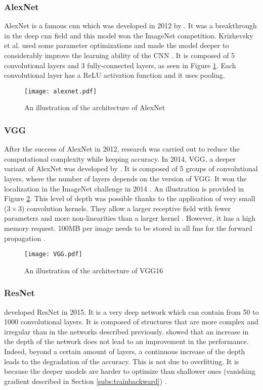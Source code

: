 \subsubsection{AlexNet}
%
AlexNet is a famous \acrshort{cnn} which was developed in 2012 by \textcite{krizhevsky_imagenet_2012}. It was a breakthrough in the deep \acrshort{cnn} field and this model won the ImageNet competition. Krizhevsky et al. used some parameter optimizations and made the model deeper to considerably improve the learning ability of the CNN \cite{khan_survey_2020}. It is composed of 5 convolutional layers and 3 fully-connected layers, as seen in Figure \ref{fig:alexnet}. Each convolutional layer has a ReLU activation function and it uses pooling.
%
\begin{figure}[H]
    \centering
    \texttt{[image: alexnet.pdf]}
    \caption{An illustration of the architecture of AlexNet \cite{krizhevsky_imagenet_2012}}
    \label{fig:alexnet}
\end{figure}
%
\subsubsection{VGG}
%
After the success of AlexNet in 2012, research was carried out to reduce the computational complexity while keeping accuracy. In 2014, VGG, a deeper variant of AlexNet was developed by \textcite{simonyan_very_2015}. It is composed of 5 groups of convolutional layers, where the number of layers depends on the version of VGG. It won the localization in the ImageNet challenge in 2014 \cite{simonyan_very_2015}. An illustration is provided in Figure \ref{fig:vgg}. This level of depth was possible thanks to the application of very small ($3 \times 3$) convolution kernels. They allow a larger receptive field with fewer parameters and more non-linearities than a larger kernel \cite{matteucci_artificial_2019}. However, it has a high memory request. 100MB per image needs to be stored in all \acrshort{fm}s for the forward propagation \cite{matteucci_artificial_2019}.
%
\begin{figure}[H]
    \centering
    \texttt{[image: VGG.pdf]}
    \caption{An illustration of the architecture of VGG16 \cite{simonyan_very_2015}}
    \label{fig:vgg}
\end{figure}
%
\subsubsection{ResNet}
%
\textcite{he_deep_2016} developed ResNet in 2015. It is a very deep network which can contain from 50 to 1000 convolutional layers. It is composed of structures that are more complex and irregular than in the networks described previously. \textcite{he_deep_2016} showed that an increase in the depth of the network does not lead to an improvement in the performance. Indeed, beyond a certain amount of layers, a continuous increase of the depth leads to the degradation of the accuracy. This is not due to overfitting. It is because the deeper models are harder to optimize than shallower ones (vanishing gradient described in Section \ref{subs:trainbackward}) \cite{matteucci_artificial_2019}. 

